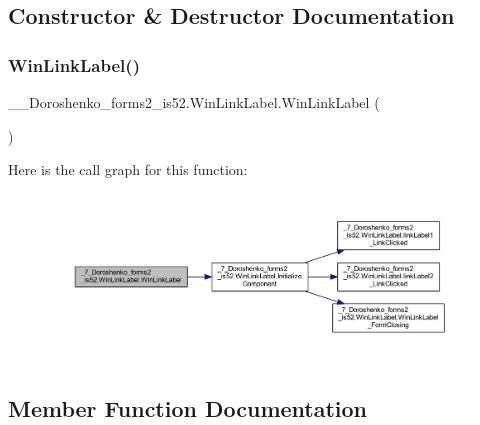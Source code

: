 \subsection{Constructor \& Destructor Documentation}
\hypertarget{class__7___doroshenko__forms2__is52_1_1_win_link_label_ad1d9501e3b59f0c0cbe474dc8bb8c43c}{}\label{class__7___doroshenko__forms2__is52_1_1_win_link_label_ad1d9501e3b59f0c0cbe474dc8bb8c43c} 
\subsubsection{\texorpdfstring{Win\+Link\+Label()}{WinLinkLabel()}}
{\footnotesize\ttfamily \+\_\+\_\+\+Doroshenko\+\_\+forms2\+\_\+is52.\+Win\+Link\+Label.\+Win\+Link\+Label (\begin{DoxyParamCaption}{ }\end{DoxyParamCaption})}

Here is the call graph for this function\+:
\nopagebreak
\begin{figure}[H]
\begin{center}
\leavevmode
\includegraphics[width=350pt]{class__7___doroshenko__forms2__is52_1_1_win_link_label_ad1d9501e3b59f0c0cbe474dc8bb8c43c_cgraph}
\end{center}
\end{figure}


\subsection{Member Function Documentation}
\hypertarget{class__7___doroshenko__forms2__is52_1_1_win_link_label_a0f1a4f23e2e973eccf38925291bd01b3}{}\label{class__7___doroshenko__forms2__is52_1_1_win_link_label_a0f1a4f23e2e973eccf38925291bd01b3} 
